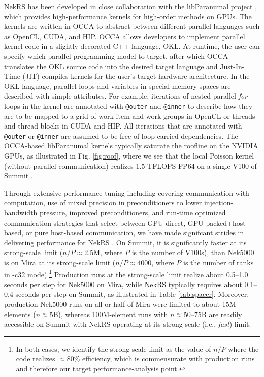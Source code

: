 NekRS has been developed in close collaboration with the libParanumal project
\cite{warburton2019,warburton2019b,ChalmersKarakusAustinSwirydowiczWarburton2020,streamParanumal2020},
which provides high-performance kernels for high-order methods on GPUs.  The
kernels are written in OCCA to abstract between different parallel languages
such as OpenCL, CUDA, and HIP. OCCA allows developers to implement parallel
kernel code in a slightly decorated C++ language, OKL.  At runtime, the user
can specify which parallel programming model to target, after which OCCA
translates the OKL source code into the desired target language and
Just-In-Time (JIT) compiles kernels for the user's target hardware
architecture.  In the OKL language, parallel loops and variables in special
memory spaces are described with simple attributes. For example, iterations of
nested parallel {\em for} loops in the kernel are annotated with
\texttt{@outer} and \texttt{@inner} to describe how they are to be mapped to a
grid of work-item and work-groups in OpenCL or threads and thread-blocks in
CUDA and HIP. All iterations that are annotated with \texttt{@outer} or
\texttt{@inner} are assumed to be free of loop carried dependencies. 
The OCCA-based libParanumal kernels
typically saturate the roofline on the NVIDIA GPUs, as illustrated
in Fig. \ref{fig:roof}, where we see that the local Poisson kernel
(without parallel communication) realizes 1.5 TFLOPS FP64 on a single V100
of Summit \cite{ceed_bp_paper_2020}.

Through extensive performance tuning including covering communication with
computation, use of mixed precision in preconditioners to lower
injection-bandwidth pressure, improved preconditioners, and run-time optimized
communication strategies that select between GPU-direct, GPU-packed+host-based,
or pure host-based communication, we have made signifcant strides in delivering
performance for NekRS \cite{nekrs}.  On Summit, it is significantly faster at
its strong-scale limit ($n/P \approx $2.5M, where $P$ is the number of V100s),
than Nek5000 is on Mira at its strong-scale limit ($n/P \approx 4000$, where $P$
is the number of ranks in -c32 mode).\footnote{In both cases, we identify the
strong-scale limit as the value of $n/P$ where the code realizes $\approx$80\%
efficiency, which is commensurate with production runs and therefore our
target performance-analysis point.}  Production runs at the strong-scale
limit realize about 0.5--1.0 seconds per step for Nek5000 on Mira, while NekRS
typically requires about 0.1--0.4 seconds per step on Summit,  as illustrated
in Table \ref{tab:spacer}.  Moreover, production Nek5000 runs on all or half of
Mira were limited to about 15M elements ($n \approx 5$B), whereas 100M-element
runs with $n \approx 50$--75B are readily accessible on Summit with NekRS
operating at its strong-scale (i.e., {\em fast}) limit.

